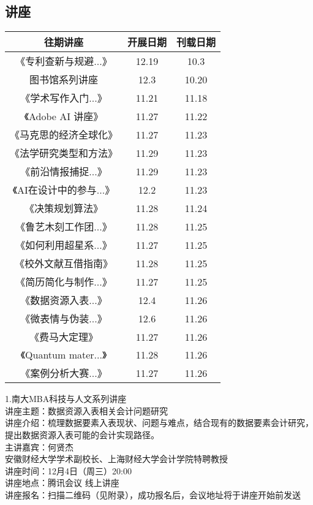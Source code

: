 \documentclass[letterpaper, 12pt]{article}
\begin{document}
\begin{multicols}{2}

\section{讲座}
\begin{tabular}{|c|c|c|}
    \hline
    往期讲座 & 开展日期 & 刊载日期\\   \hline\hline
    《专利查新与规避...》 & 12.19 & 10.3\\
    图书馆系列讲座 & 12.3 & 10.20\\
    《学术写作入门...》& 11.21 & 11.18\\
    《Adobe AI 讲座》 & 11.27 & 11.22\\
    《马克思的经济全球化》 & 11.27 & 11.23\\
    《法学研究类型和方法》 & 11.29 & 11.23\\
    《前沿情报捕捉...》 & 11.29 & 11.23\\
    《AI在设计中的参与...》 & 12.2 & 11.23\\
    《决策规划算法》 & 11.28 & 11.24\\
    《鲁艺木刻工作团...》 & 11.28 & 11.25\\
    《如何利用超星系...》 & 11.27 & 11.25\\
    《校外文献互借指南》 & 11.28 & 11.25\\
    《简历简化与制作...》 & 11.27 & 11.25\\
    《数据资源入表...》 & 12.4 & 11.26\\
    《微表情与伪装...》 & 12.6 & 11.26\\
    《费马大定理》 & 11.27 & 11.26\\
    《Quantum mater...》 & 11.28 & 11.26\\
    《案例分析大赛...》 & 11.27 & 11.26\\
    \hline
\end{tabular}

1.南大MBA科技与人文系列讲座\\
讲座主题：数据资源入表相关会计问题研究\\
讲座介绍：梳理数据要素入表现状、问题与难点，结合现有的数据要素会计研究，提出数据资源入表可能的会计实现路径。\\
主讲嘉宾：何贤杰\\
安徽财经大学学术副校长、上海财经大学会计学院特聘教授\\
讲座时间：12月4日（周三）20:00\\
讲座地点：腾讯会议 线上讲座\\
讲座报名：扫描二维码（见附录），成功报名后，会议地址将于讲座开始前发送\\


\end{multicols}
\end{document}
